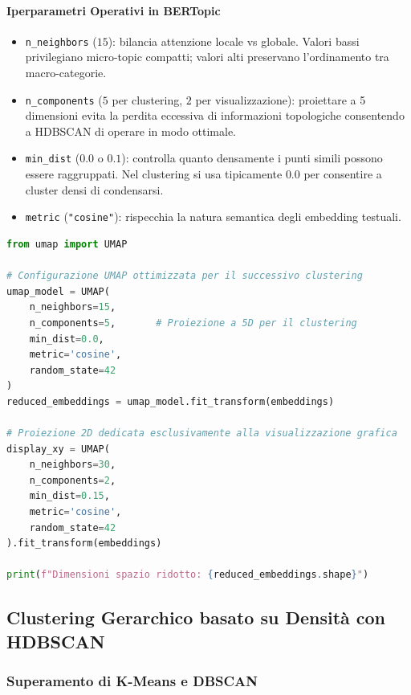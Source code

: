 \paragraph{Iperparametri Operativi in BERTopic}
\begin{itemize}
    \item \texttt{n\_neighbors} ($15$): bilancia attenzione locale vs globale. Valori bassi privilegiano micro-topic compatti; valori alti preservano l'ordinamento tra macro-categorie.
    \item \texttt{n\_components} ($5$ per clustering, $2$ per visualizzazione): proiettare a 5 dimensioni evita la perdita eccessiva di informazioni topologiche consentendo a HDBSCAN di operare in modo ottimale.
    \item \texttt{min\_dist} ($0.0$ o $0.1$): controlla quanto densamente i punti simili possono essere raggruppati. Nel clustering si usa tipicamente $0.0$ per consentire a cluster densi di condensarsi.
    \item \texttt{metric} (\texttt{"cosine"}): rispecchia la natura semantica degli embedding testuali.
\end{itemize}

\begin{lstlisting}[language=Python, caption={Riduzione della dimensionalità con UMAP su vettori di embedding.}]
from umap import UMAP

# Configurazione UMAP ottimizzata per il successivo clustering
umap_model = UMAP(
    n_neighbors=15,
    n_components=5,       # Proiezione a 5D per il clustering
    min_dist=0.0,
    metric='cosine',
    random_state=42
)
reduced_embeddings = umap_model.fit_transform(embeddings)

# Proiezione 2D dedicata esclusivamente alla visualizzazione grafica
display_xy = UMAP(
    n_neighbors=30, 
    n_components=2, 
    min_dist=0.15, 
    metric='cosine', 
    random_state=42
).fit_transform(embeddings)

print(f"Dimensioni spazio ridotto: {reduced_embeddings.shape}")
\end{lstlisting}

\FloatBarrier
\subsection{Clustering Gerarchico basato su Densità con HDBSCAN}
\label{sec:lab-hdbscan-clustering}

\FloatBarrier
\subsubsection{Superamento di K-Means e DBSCAN}
\label{subsec:lab-why-hdbscan}

